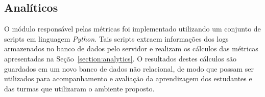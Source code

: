 \subsection{Analíticos}


O módulo responsável pelas métricas foi implementado utilizando um conjunto de scripts em linguagem \textit{Python}. Tais scripts extraem informações dos logs armazenados no banco de dados pelo servidor e realizam os cálculos das métricas apresentadas na Seção~\ref{section:analytics}. O resultados destes cálculos são guardados em um novo banco de dados não relacional, de modo que possam ser utilizados para acompanhamento e avaliação da aprendizagem dos estudantes e das turmas que utilizaram o ambiente proposto.  %


